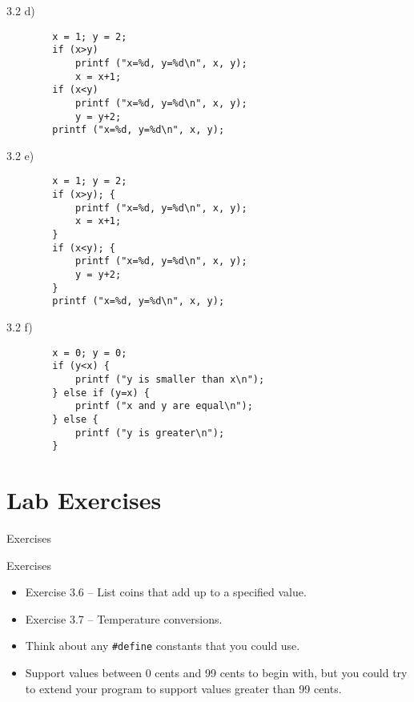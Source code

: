 \documentclass{beamer}
\begin{document}
\begin{frame}[fragile]{3.2 d)}
    \begin{verbatim}
        x = 1; y = 2;
        if (x>y)
            printf ("x=%d, y=%d\n", x, y);
            x = x+1;
        if (x<y)
            printf ("x=%d, y=%d\n", x, y);
            y = y+2;
        printf ("x=%d, y=%d\n", x, y);
    \end{verbatim}
\end{frame}

\begin{frame}[fragile]{3.2 e)}
    \begin{verbatim}
        x = 1; y = 2;
        if (x>y); {
            printf ("x=%d, y=%d\n", x, y);
            x = x+1;
        }
        if (x<y); {
            printf ("x=%d, y=%d\n", x, y);
            y = y+2;
        }
        printf ("x=%d, y=%d\n", x, y);
    \end{verbatim}
\end{frame}

\begin{frame}[fragile]{3.2 f)}
    \begin{verbatim}
        x = 0; y = 0;
        if (y<x) {
            printf ("y is smaller than x\n");
        } else if (y=x) {
            printf ("x and y are equal\n");
        } else {
            printf ("y is greater\n");
        }
    \end{verbatim}
\end{frame}

\section{Lab Exercises}

\begin{frame}{Exercises}
    \begin{block}{Exercises}
        \begin{itemize}
            \item Exercise 3.6 -- List coins that add up to a specified value.
            \item Exercise 3.7 -- Temperature conversions.
        \end{itemize}
    \end{block}
    \begin{itemize}
        \item Think about any \texttt{\#define} constants that you could use.
        \item Support values between 0 cents and 99 cents to begin with, but
            you could try to extend your program to support values greater
            than 99 cents.
    \end{itemize}
\end{frame}
\end{document}
